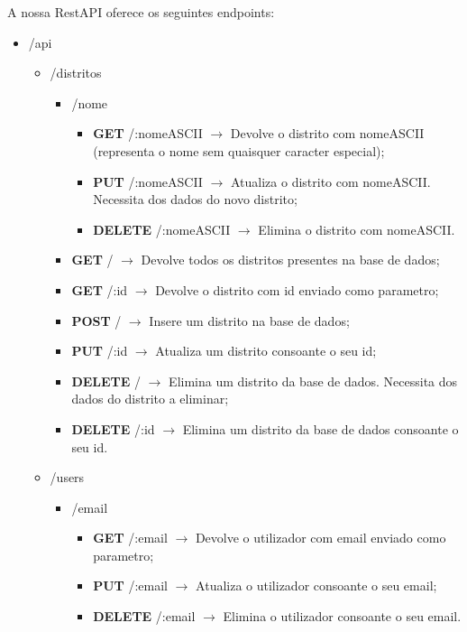 A nossa RestAPI oferece os seguintes endpoints:

\begin{itemize}
    \item /api
    \begin{itemize}
        \item /distritos
        \begin{itemize}
            \item /nome
                \begin{itemize}
                    \item \textbf{GET} /:nomeASCII $\rightarrow$ Devolve o distrito com nomeASCII (representa o nome sem quaisquer caracter especial);
                    \item \textbf{PUT} /:nomeASCII $\rightarrow$ Atualiza o distrito com nomeASCII. Necessita dos dados do novo distrito;
                    \item \textbf{DELETE} /:nomeASCII $\rightarrow$ Elimina o distrito com nomeASCII.
                \end{itemize}
            \item \textbf{GET} / $\rightarrow$ Devolve todos os distritos presentes na base de dados;
            \item \textbf{GET} /:id $\rightarrow$ Devolve o distrito com id enviado como parametro;
            \item \textbf{POST} / $\rightarrow$ Insere um distrito na base de dados;
            \item \textbf{PUT} /:id $\rightarrow$ Atualiza um distrito consoante o seu id;
            \item \textbf{DELETE} / $\rightarrow$ Elimina um distrito da base de dados. Necessita dos dados do distrito a eliminar;
            \item \textbf{DELETE} /:id $\rightarrow$ Elimina um distrito da base de dados consoante o seu id.
        \end{itemize}
        \item /users
        \begin{itemize}
            \item /email
                \begin{itemize}
                    \item \textbf{GET} /:email $\rightarrow$ Devolve o utilizador com email enviado como parametro;
                    \item \textbf{PUT} /:email $\rightarrow$ Atualiza o utilizador consoante o seu email;
                    \item \textbf{DELETE} /:email $\rightarrow$ Elimina o utilizador consoante o seu email.

\end{itemize}
\end{itemize}
\end{itemize}
\end{itemize}
